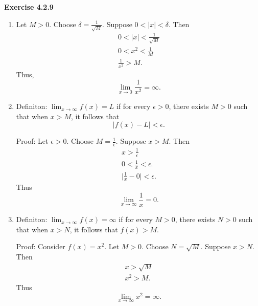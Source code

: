 \documentclass[12pt]{article}
\begin{document}
\textbf{Exercise 4.2.9}
\begin{enumerate}[label=(\alph*)]
    \item Let \( M > 0 \). Choose \( \delta = \frac{1}{\sqrt{M}} \). Suppose \( 0 < \vert x \vert < \delta \). Then
          \[
              \begin{split}
                  0 < \vert x \vert < \frac{1}{\sqrt{M}} \\
                  0 < x^2 < \frac{1}{M}                  \\
                  \frac{1}{x^2} > M.
              \end{split}
          \]
          Thus,
          \[
              \lim_{x \to 0} \frac{1}{x^2} = \infty .
          \]
    \item Definiton: \( \lim_{x \to \infty} f(x) = L \) if for every \( \epsilon > 0 \), there exists \( M > 0 \) such that when \( x > M \), it follows that
          \[
              \vert f(x) - L  \vert < \epsilon.
          \]

          Proof: Let \( \epsilon > 0 \). Choose \( M = \frac{1}{\epsilon} \). Suppose \( x > M \). Then
          \[
              \begin{split}
                  x > \frac{1}{\epsilon}      \\
                  0 < \frac{1}{x} < \epsilon. \\
                  \vert \frac{1}{x} - 0 \vert < \epsilon.
              \end{split}
          \]
          Thus
          \[
              \lim_{x \to \infty} \frac{1}{x} = 0.
          \]
    \item Definiton: \( \lim_{x \to \infty} f(x) = \infty  \) if for every \( M > 0 \), there exists \( N > 0 \) such that when \( x > N \), it follows that \( f(x) > M \).

          Proof: Consider \( f(x) = x^2 \). Let \( M > 0 \). Choose \( N = \sqrt{M} \). Suppose \( x > N \). Then
          \[
              \begin{split}
                  x > \sqrt{M} \\
                  x^2 > M.
              \end{split}
          \]
          Thus
          \[
              \lim_{x \to \infty} x^2 = \infty .
          \]

\end{enumerate}
\end{document}
